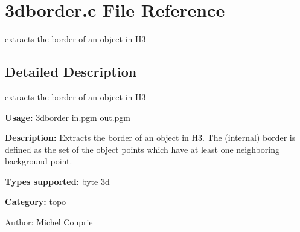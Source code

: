 \section{3dborder.c File Reference}
\label{3dborder_8c}
extracts the border of an object in H3 



\subsection{Detailed Description}
extracts the border of an object in H3 

{\bf Usage:} 3dborder in.pgm out.pgm

{\bf Description:} Extracts the border of an object in H3. The (internal) border is defined as the set of the object points which have at least one neighboring background point.

{\bf Types supported:} byte 3d

{\bf Category:} topo

\begin{Desc}
\item[Author:]Michel Couprie \end{Desc}
